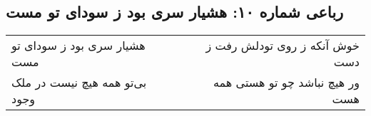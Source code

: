 \begin{center}
\section*{رباعی شماره ۱۰: هشیار سری بود ز سودای تو مست}
\label{sec:010}
\begin{longtable}{l p{0.5cm} r}
هشیار سری بود ز سودای تو مست
&&
خوش آنکه ز روی تودلش رفت ز دست
\\
بی‌تو همه هیچ نیست در ملک وجود
&&
ور هیچ نباشد چو تو هستی همه هست
\\
\end{longtable}
\end{center}

